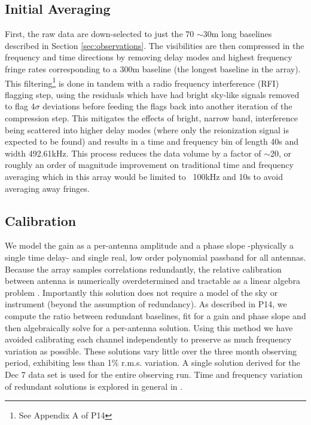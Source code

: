 \documentclass[preprint2]{aastex}
\begin{document}
\subsection{Initial Averaging}
  First, the raw data are down-selected to just the 70 $\sim$30m long baselines described in Section \ref{sec:observations}.  
   The visibilities are then compressed in the frequency and time directions by removing delay modes and highest frequency fringe rates corresponding to a 300m baseline (the longest baseline in the array).  This filtering\footnote{See Appendix A of P14} is done in tandem with a radio frequency interference (RFI) flagging step, using the residuals which have had bright sky-like signals removed to flag 4$\sigma$ deviations before feeding the flags back into another iteration of the compression step. This mitigates the effects of bright, narrow band, interference  being scattered into higher delay modes (where only the reionization signal is expected to be found) and results in a time and frequency bin of length 40s and width 492.61kHz. 
  This process reduces the data volume by a factor of $\sim$20, or roughly an order of magnitude improvement on traditional time and frequency averaging which in this array would be limited to ~100kHz and 10s to avoid averaging away fringes.
  
\subsection{Calibration}
\label{sec:calibration}
We model the gain as a per-antenna amplitude and a phase slope -physically a single time delay- and single real, low order polynomial passband for all antennas.  Because the array samples correlations redundantly, the relative calibration between antenna is numerically overdetermined and tractable as a linear algebra problem \citep{Liu:2010p10391}.  Importantly this solution does not require a model of the sky or instrument (beyond the assumption of redundancy).  
As described in P14, we compute the ratio between redundant baselines, fit for a gain and phase slope and then algebraically solve for a per-antenna solution.  Using this method we have avoided calibrating each channel independently to preserve as much frequency variation as possible.   These solutions vary little over the three month observing period, exhibiting less than 1\% r.m.s. variation. A single solution derived for the Dec 7 data set is used for the entire observing run. Time and frequency variation of redundant solutions is explored in general in \citet{Zheng:2014p10467}.  
\end{document}
